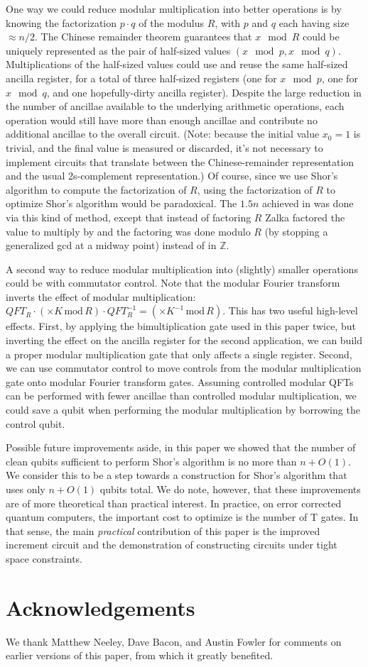 \documentclass[twocolumn,longbibliography]{quantumarticle-customized}
\begin{document}
One way we could reduce modular multiplication into better operations is by knowing the factorization $p \cdot q$ of the modulus $R$, with $p$ and $q$ each having size $\approx n/2$.
The Chinese remainder theorem guarantees that $x \mod R$ could be uniquely represented as the pair of half-sized values $(x \mod p, x \mod q)$.
Multiplications of the half-sized values could use and reuse the same half-sized ancilla register, for a total of three half-sized registers (one for $x \mod p$, one for $x \mod q$, and one hopefully-dirty ancilla register).
Despite the large reduction in the number of ancillae available to the underlying arithmetic operations, each operation would still have more than enough ancillae and contribute no additional ancillae to the overall circuit.
(Note: because the initial value $x_0 = 1$ is trivial, and the final value is measured or discarded, it's not necessary to implement circuits that translate between the Chinese-remainder representation and the usual 2s-complement representation.)
Of course, since we use Shor's algorithm to compute the factorization of $R$, using the factorization of $R$ to optimize Shor's algorithm would be paradoxical.
The $1.5n$ achieved in \cite{zalka2006} was done via this kind of method, except that instead of factoring $R$ Zalka factored the value to multiply by and the factoring was done modulo $R$ (by stopping a generalized gcd at a midway point) instead of in $\mathbb{Z}$.

A second way to reduce modular multiplication into (slightly) smaller operations could be with commutator control.
Note that the modular Fourier transform inverts the effect of modular multiplication: $QFT_{R} \cdot (\times K \,\text{mod}\, R) \cdot QFT_R^{-1} = (\times K^{-1} \,\text{mod}\, R)$.
This has two useful high-level effects.
First, by applying the bimultiplication gate used in this paper twice, but inverting the effect on the ancilla register for the second application, we can build a proper modular multiplication gate that only affects a single register.
Second, we can use commutator control to move controls from the modular multiplication gate onto modular Fourier transform gates.
Assuming controlled modular QFTs can be performed with fewer ancillae than controlled modular multiplication, we could save a qubit when performing the modular multiplication by borrowing the control qubit.

Possible future improvements aside, in this paper we showed that the number of clean qubits sufficient to perform Shor's algorithm is no more than $n + O(1)$.
We consider this to be a step towards a construction for Shor's algorithm that uses only $n + O(1)$ qubits total.
We do note, however, that these improvements are of more theoretical than practical interest.
In practice, on error corrected quantum computers, the important cost to optimize is the number of T gates.
In that sense, the main {\em practical} contribution of this paper is the improved increment circuit and the demonstration of constructing circuits under tight space constraints.


\section{Acknowledgements}

We thank Matthew Neeley, Dave Bacon, and Austin Fowler for comments on earlier versions of this paper, from which it greatly benefited.




\end{document}
